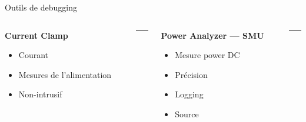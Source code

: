 \begin{frame}[t]{Outils de debugging}
    \vspace{-8pt}
    \begin{columns}[T]
        \begin{column}{0.33\textwidth}
            \vspace{-12pt}
            \begin{center}
                \textbf{Current Clamp}
            \end{center}
            \begin{itemize}
                \item Courant
                \bigskip
                \item Mesures de l'alimentation
                \item Non-intrusif
            \end{itemize}
        \end{column}
        \begin{column}{0.001\textwidth}
            \rule{0.1mm}{0.85\textheight}
        \end{column}

        \begin{column}{0.33\textwidth}
            \vspace{-12pt}
            \begin{center}
                \textbf{Power Analyzer --- SMU}
            \end{center}
            \begin{itemize}
                \item Mesure power DC
                \bigskip
                \item Précision
                \item Logging
                \item Source
            \end{itemize}
        \end{column}
        \begin{column}{0.001\textwidth}
            \rule{0.1mm}{0.85\textheight}
        \end{column}


\end{columns}
\end{frame}
